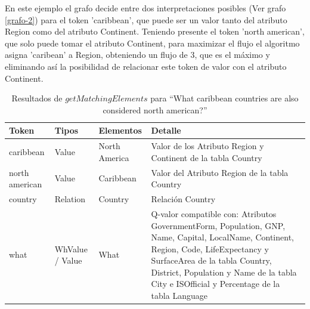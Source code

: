 En este ejemplo el grafo decide entre dos interpretaciones posibles  (Ver grafo \ref{grafo-2}) para el token 'caribbean', que puede ser un valor tanto del atributo Region como del atributo Continent. Teniendo presente el token 'north american', que solo puede tomar el atributo Continent, para maximizar el flujo el algoritmo asigna 'caribean' a Region, obteniendo un flujo de 3, que es el máximo y eliminando así la posibilidad de relacionar este token de valor con el atributo Continent.

\begin{center}
\begin{table}[h]
\centering
\begin{tabular}{| p{2cm} | p{2cm} | p{2cm} | p{6cm} |}
\hline
Token & Tipos & Elementos & Detalle \\ \hline
caribbean & Value & North America & Valor de los Atributo Region y Continent de la tabla Country\\ \hline
north american & Value & Caribbean & Valor del Atributo Region de la tabla Country\\ \hline
country & Relation & Country & Relación Country\\ \hline
what & WhValue / Value & What & Q-valor compatible con: Atributos GovernmentForm, Population, GNP, Name, Capital, LocalName, Continent, Region, Code, LifeExpectancy y SurfaceArea de la tabla Country, District, Population y Name de la tabla City e ISOfficial y Percentage de la tabla Language\\ \hline
\end{tabular}
\caption{Resultados de $getMatchingElements$ para ``What caribbean countries are also considered north american?''}
\label{table:get-matching-elements-2}
\end{table}
\end{center}

